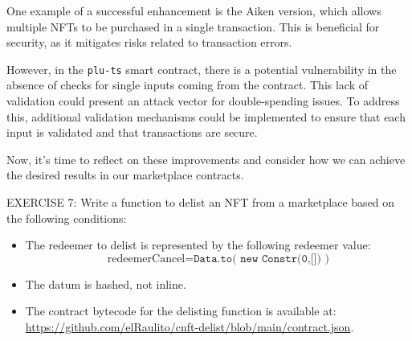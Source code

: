 One example of a successful enhancement is the Aiken version, which allows multiple NFTs to be purchased in a single transaction. This is beneficial for security, as it mitigates risks related to transaction errors.

However, in the \texttt{plu-ts} smart contract, there is a potential vulnerability in the absence of checks for single inputs coming from the contract. This lack of validation could present an attack vector for double-spending issues. To address this, additional validation mechanisms could be implemented to ensure that each input is validated and that transactions are secure.

Now, it’s time to reflect on these improvements and consider how we can achieve the desired results in our marketplace contracts.


\begin{remark}
  EXERCISE 7: Write a function to delist an NFT from a marketplace based on the following conditions:

  \begin{itemize}
      \item The redeemer to delist is represented by the following redeemer value:
      \[
      \text{redeemerCancel} = \texttt{Data.to( new Constr(0,[]) )}
      \]
      \item The datum is hashed, not inline.
      \item The contract bytecode for the delisting function is available at:
      \url{https://github.com/elRaulito/cnft-delist/blob/main/contract.json}.
  \end{itemize}
\end{remark}



